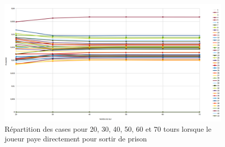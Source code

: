 \documentclass[letterpaper]{article}
\begin{document}
\begin{center}
	  \begin{figure}[bp!]
	    \includegraphics[scale=0.4]{./Images/GraphRepPaye20-70.png}
	    \caption{\label{graph_all_result_paye} Répartition des cases pour 20, 30, 40, 50, 60 et 70 tours lorsque le joueur paye directement pour sortir de prison}
	  \end{figure}
	\end{center}
    \newpage
\end{document}
